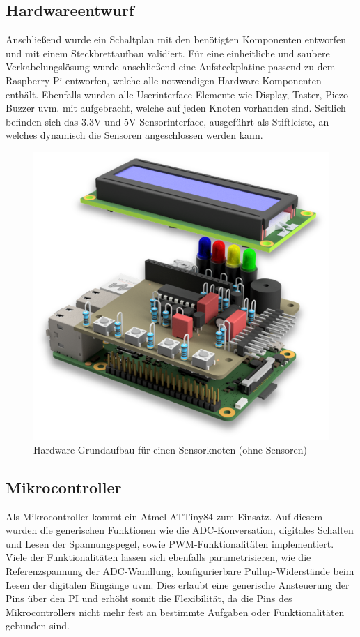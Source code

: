  \subsection{Hardwareentwurf}

 Anschließend wurde ein Schaltplan mit den benötigten Komponenten entworfen und mit einem Steckbrettaufbau validiert. Für eine einheitliche und saubere Verkabelungslösung wurde anschließend eine Aufsteckplatine passend zu dem Raspberry Pi entworfen, welche alle notwendigen Hardware-Komponenten enthält. Ebenfalls wurden alle Userinterface-Elemente wie Display, Taster, Piezo-Buzzer uvm. mit aufgebracht, welche auf jeden Knoten vorhanden sind. Seitlich befinden sich das 3.3V und 5V Sensorinterface, ausgeführt als Stiftleiste, an welches dynamisch die Sensoren angeschlossen werden kann. 

 \begin{figure}[h!]
      \centering
      \includegraphics[scale=0.5]{abbildungen/hardwareentwurf.png}
      \caption{Hardware Grundaufbau für einen Sensorknoten (ohne Sensoren)}
 \end{figure}


\subsection{Mikrocontroller}

Als Mikrocontroller kommt ein Atmel ATTiny84 zum Einsatz. Auf diesem wurden die generischen Funktionen wie die ADC-Konversation, digitales Schalten und Lesen der Spannungspegel, sowie PWM-Funktionalitäten implementiert. Viele der Funktionalitäten lassen sich ebenfalls parametrisieren, wie die Referenzspannung der ADC-Wandlung, konfigurierbare Pullup-Widerstände beim Lesen der digitalen Eingänge uvm. Dies erlaubt eine generische Ansteuerung der Pins über den PI und erhöht somit die Flexibilität, da die Pins des Mikrocontrollers nicht mehr fest an bestimmte Aufgaben oder Funktionalitäten gebunden sind. 

